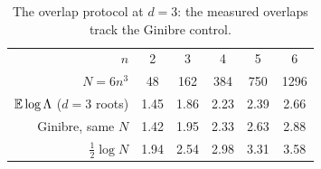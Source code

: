 \begin{table}[ht]
  \centering
  \begin{tabular}{r|ccccc}
    $n$ & 2 & 3 & 4 & 5 & 6 \\
    $N=6n^3$ & 48 & 162 & 384 & 750 & 1296 \\
    \hline
    $\mathbb{E}\log\Lambda$ ($d=3$ roots) & 1.45 & 1.86 & 2.23 & 2.39 & 2.66 \\
    Ginibre, same $N$ & 1.42 & 1.95 & 2.33 & 2.63 & 2.88 \\
    $\frac12\log N$ & 1.94 & 2.54 & 2.98 & 3.31 & 3.58
  \end{tabular}
  \caption{The overlap protocol at $d=3$: the measured overlaps track the Ginibre control.}
  \label{tab:overlap3}
\end{table}
